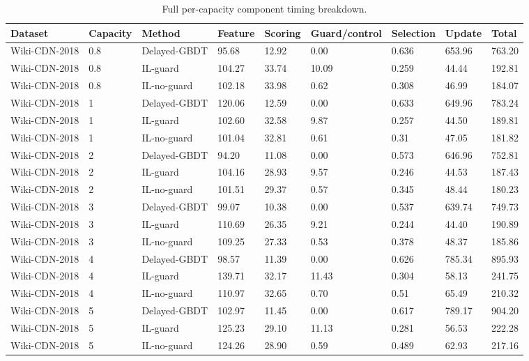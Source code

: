 \begin{table}[t]
\centering
\footnotesize
\caption{Full per-capacity component timing breakdown.}
\label{tab:component_full_appendix}
\begin{tabular}{lllllllll}
\toprule
Dataset & Capacity & Method & Feature & Scoring & Guard/control & Selection & Update & Total \\
\midrule
Wiki-CDN-2018 & 0.8 & Delayed-GBDT & 95.68 & 12.92 & 0.00 & 0.636 & 653.96 & 763.20 \\
Wiki-CDN-2018 & 0.8 & IL-guard & 104.27 & 33.74 & 10.09 & 0.259 & 44.44 & 192.81 \\
Wiki-CDN-2018 & 0.8 & IL-no-guard & 102.18 & 33.98 & 0.62 & 0.308 & 46.99 & 184.07 \\
Wiki-CDN-2018 & 1 & Delayed-GBDT & 120.06 & 12.59 & 0.00 & 0.633 & 649.96 & 783.24 \\
Wiki-CDN-2018 & 1 & IL-guard & 102.60 & 32.58 & 9.87 & 0.257 & 44.50 & 189.81 \\
Wiki-CDN-2018 & 1 & IL-no-guard & 101.04 & 32.81 & 0.61 & 0.31 & 47.05 & 181.82 \\
Wiki-CDN-2018 & 2 & Delayed-GBDT & 94.20 & 11.08 & 0.00 & 0.573 & 646.96 & 752.81 \\
Wiki-CDN-2018 & 2 & IL-guard & 104.16 & 28.93 & 9.57 & 0.246 & 44.53 & 187.43 \\
Wiki-CDN-2018 & 2 & IL-no-guard & 101.51 & 29.37 & 0.57 & 0.345 & 48.44 & 180.23 \\
Wiki-CDN-2018 & 3 & Delayed-GBDT & 99.07 & 10.38 & 0.00 & 0.537 & 639.74 & 749.73 \\
Wiki-CDN-2018 & 3 & IL-guard & 110.69 & 26.35 & 9.21 & 0.244 & 44.40 & 190.89 \\
Wiki-CDN-2018 & 3 & IL-no-guard & 109.25 & 27.33 & 0.53 & 0.378 & 48.37 & 185.86 \\
Wiki-CDN-2018 & 4 & Delayed-GBDT & 98.57 & 11.39 & 0.00 & 0.626 & 785.34 & 895.93 \\
Wiki-CDN-2018 & 4 & IL-guard & 139.71 & 32.17 & 11.43 & 0.304 & 58.13 & 241.75 \\
Wiki-CDN-2018 & 4 & IL-no-guard & 110.97 & 32.65 & 0.70 & 0.51 & 65.49 & 210.32 \\
Wiki-CDN-2018 & 5 & Delayed-GBDT & 102.97 & 11.45 & 0.00 & 0.617 & 789.17 & 904.20 \\
Wiki-CDN-2018 & 5 & IL-guard & 125.23 & 29.10 & 11.13 & 0.281 & 56.53 & 222.28 \\
Wiki-CDN-2018 & 5 & IL-no-guard & 124.26 & 28.90 & 0.59 & 0.489 & 62.93 & 217.16 \\

\end{tabular}
\end{table}
